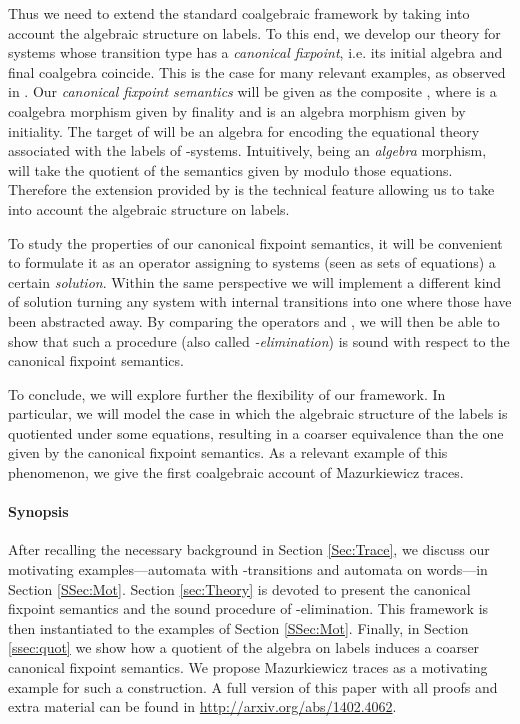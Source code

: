 \documentclass[oribibl,envcountsame,envcountsect,runningheads]{llncs}
\renewcommand{\>}{\rangle}
\begin{document}
Thus we need to extend the standard coalgebraic framework by taking into account the algebraic structure on labels. To this end, we develop our theory for systems whose transition type  has a \emph{canonical fixpoint}, i.e. its initial algebra and final coalgebra coincide. This is the case for many relevant examples, as observed in \cite{HasuoJS:07}. Our \emph{canonical fixpoint semantics} will be given as the composite , where  is a coalgebra morphism given by finality and  is an algebra morphism given by initiality. The target of  will be an algebra for  encoding the equational theory associated with the labels of -systems. Intuitively,  being an \emph{algebra} morphism, will take the quotient of the semantics given by  modulo those equations. Therefore the extension provided by  is the technical feature allowing us to take into account the algebraic structure on labels.

To study the properties of our canonical fixpoint semantics, it will be convenient to formulate it as an operator  assigning to systems (seen as sets of equations) a certain \emph{solution}. Within the same perspective we will implement a different kind of solution  turning any system  with internal transitions into one  where those have been abstracted away. By comparing the operators  and , we will then be able to show that such a procedure (also called \emph{-elimination}) is sound with respect to the canonical fixpoint semantics.

To conclude, we will explore further the flexibility of our framework. In particular, we will model the case in which the algebraic structure of the labels is quotiented under some equations, resulting in a coarser equivalence than the one given by the canonical fixpoint semantics. As a relevant example of this phenomenon, we give the first coalgebraic account of Mazurkiewicz traces.

\paragraph{Synopsis} After recalling the necessary background in Section \ref{Sec:Trace}, we discuss our motivating examples---automata with -transitions and automata on words---in Section \ref{SSec:Mot}. Section \ref{sec:Theory} is devoted to present the canonical fixpoint semantics and the sound procedure of -elimination. This framework is then instantiated to the examples of Section \ref{SSec:Mot}. Finally, in Section \ref{ssec:quot} we show how a quotient of the algebra on labels induces a coarser canonical fixpoint semantics. We propose Mazurkiewicz traces as a motivating example for such a construction. A full version of this paper with all proofs and extra material can be found in \url{http://arxiv.org/abs/1402.4062}.
\end{document}
